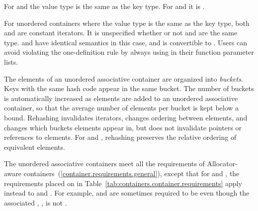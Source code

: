\pnum
For  and  the value type is
the same as the key type.  For  and
 it is .

\pnum
For unordered containers where the value type is the same as the key
type, both  and  are constant
iterators. It is unspecified whether or not  and
 are the same type.
\enternote {} and  have identical
semantics in this case, and  is convertible to
. Users can avoid violating the one-definition rule
by always using  in their function parameter lists.
\exitnote

\pnum
{}%
%
The elements of an unordered associative container are organized into
\textit{buckets}.  Keys with the same hash code appear in the same
bucket.  The number of buckets is automatically increased as elements
are added to an unordered associative container, so that the average
number of elements per bucket is kept below a bound.  Rehashing
invalidates iterators, changes ordering between elements, and changes
which buckets elements appear in, but does not invalidate pointers or
references to elements. For  and
, rehashing preserves the relative ordering of
equivalent elements.

\pnum
The unordered associative containers meet all the requirements of Allocator-aware
containers~(\ref{container.requirements.general}), except that for
 and , the requirements placed on 
in Table~\ref{tab:containers.container.requirements} apply instead to 
and . \enternote For example,  and 
are sometimes required to be  even though the associated
, , is not
. \exitnote

